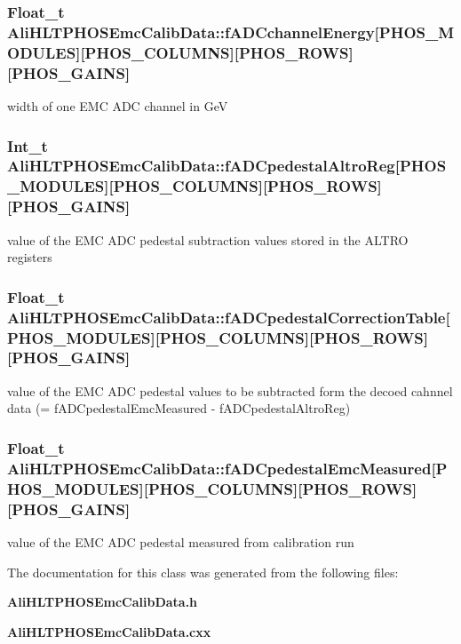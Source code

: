 \subsubsection{\setlength{\rightskip}{0pt plus 5cm}Float\_\-t {\bf Ali\-HLTPHOSEmc\-Calib\-Data::f\-ADCchannel\-Energy}[PHOS\_\-MODULES][PHOS\_\-COLUMNS][PHOS\_\-ROWS][PHOS\_\-GAINS]\hspace{0.3cm}{\tt  [protected]}}\label{classAliHLTPHOSEmcCalibData_p0}


width of one EMC ADC channel in Ge\-V 
\subsubsection{\setlength{\rightskip}{0pt plus 5cm}Int\_\-t {\bf Ali\-HLTPHOSEmc\-Calib\-Data::f\-ADCpedestal\-Altro\-Reg}[PHOS\_\-MODULES][PHOS\_\-COLUMNS][PHOS\_\-ROWS][PHOS\_\-GAINS]\hspace{0.3cm}{\tt  [protected]}}\label{classAliHLTPHOSEmcCalibData_p2}


value of the EMC ADC pedestal subtraction values stored in the ALTRO registers 
\subsubsection{\setlength{\rightskip}{0pt plus 5cm}Float\_\-t {\bf Ali\-HLTPHOSEmc\-Calib\-Data::f\-ADCpedestal\-Correction\-Table}[PHOS\_\-MODULES][PHOS\_\-COLUMNS][PHOS\_\-ROWS][PHOS\_\-GAINS]\hspace{0.3cm}{\tt  [protected]}}\label{classAliHLTPHOSEmcCalibData_p3}


value of the EMC ADC pedestal values to be subtracted form the decoed cahnnel data (= f\-ADCpedestal\-Emc\-Measured - f\-ADCpedestal\-Altro\-Reg) 
\subsubsection{\setlength{\rightskip}{0pt plus 5cm}Float\_\-t {\bf Ali\-HLTPHOSEmc\-Calib\-Data::f\-ADCpedestal\-Emc\-Measured}[PHOS\_\-MODULES][PHOS\_\-COLUMNS][PHOS\_\-ROWS][PHOS\_\-GAINS]\hspace{0.3cm}{\tt  [protected]}}\label{classAliHLTPHOSEmcCalibData_p1}


value of the EMC ADC pedestal measured from calibration run 

The documentation for this class was generated from the following files:\begin{CompactItemize}
\item 
{\bf Ali\-HLTPHOSEmc\-Calib\-Data.h}\item 
{\bf Ali\-HLTPHOSEmc\-Calib\-Data.cxx}\end{CompactItemize}
